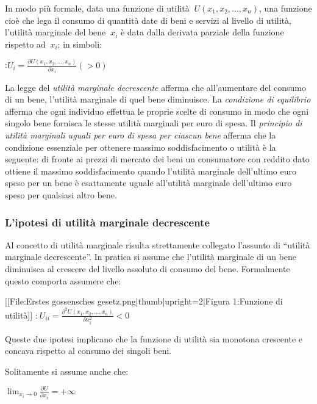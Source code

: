 In modo più formale, data una funzione di utilità \(\ 
U(x_1,x_2,\ldots,x_n)\), una funzione cioè che 
lega il consumo di quantità date di beni e servizi al livello di utilità, 
l'utilità marginale del bene \(\ x_i\) è data dalla derivata 
parziale della funzione rispetto ad \(\ x_i\); in simboli:

:\(U_i = \frac{\partial U(x_1,x_2,\ldots,x_n)}{\partial x_i} (>0)\)

La legge del \emph{utilità marginale decrescente} afferma che all'aumentare del 
consumo di un bene, l'utilità marginale di quel bene diminuisce.
La \emph{condizione di equilibrio} afferma che ogni individuo effettua le 
proprie scelte di consumo in modo che ogni singolo bene fornisca le stesse 
utilità marginali per euro di spesa.
Il \emph{principio di utilità marginali uguali per euro di spesa per ciascun 
bene} afferma che la condizione essenziale per ottenere massimo 
soddisfacimento o utilità è la seguente: di fronte ai prezzi di mercato dei 
beni un consumatore con reddito dato ottiene il massimo soddisfacimento quando 
l'utilità marginale dell'ultimo euro speso per un bene è esattamente uguale 
all'utilità marginale dell'ultimo euro speso per qualsiasi altro bene.

\subsubsection{L'ipotesi di utilità marginale decrescente}

Al concetto di utilità marginale risulta strettamente collegato l'assunto di 
``utilità marginale decrescente''. In pratica si assume che l'utilità marginale 
di un bene diminuisca al crescere del livello assoluto di consumo del bene. 
Formalmente questo comporta assumere che: 

[[File:Erstes gossensches gesetz.png|thumb|upright=2|Figura 1:Funzione di 
utilità]]
:\(\ U_{ii} = \frac{\partial^2 U(x_1,x_2,\ldots,x_n)}{\partial x_i^2} < 0\) 

Queste due ipotesi implicano che la funzione di utilità sia monotona crescente 
e concava rispetto al consumo dei singoli beni.

Solitamente si assume anche che:

\(\lim_{x_i \rightarrow 0} \frac{\partial U}{\partial x_i} = + 
\infty\)

